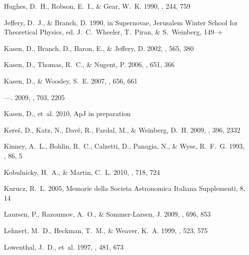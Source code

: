 \documentclass[]{emulateapj}
\begin{document}
\begin{thebibliography}{74}
{Hughes}, D.~H., {Robson}, E.~I., \& {Gear}, W.~K. 1990, \mnras, 244, 759

{Jeffery}, D.~J., \& {Branch}, D. 1990, in Supernovae, Jerusalem Winter School
  for Theoretical Physics, ed. {J.~C.~Wheeler, T.~Piran, \& S.~Weinberg},
  149--+

{Kasen}, D., {Branch}, D., {Baron}, E., \& {Jeffery}, D. 2002, \apj, 565, 380

{Kasen}, D., {Thomas}, R.~C., \& {Nugent}, P. 2006, \apj, 651, 366

{Kasen}, D., \& {Woosley}, S.~E. 2007, \apj, 656, 661

---. 2009, \apj, 703, 2205

{Kasen}, D., {et~al.} 2010, ApJ in preparation

{Kere{\v s}}, D., {Katz}, N., {Dav{\'e}}, R., {Fardal}, M., \& {Weinberg},
  D.~H. 2009, \mnras, 396, 2332

{Kinney}, A.~L., {Bohlin}, R.~C., {Calzetti}, D., {Panagia}, N., \& {Wyse},
  R.~F.~G. 1993, \apjs, 86, 5

{Kobulnicky}, H.~A., \& {Martin}, C.~L. 2010, \apj, 718, 724

{Kurucz}, R.~L. 2005, Memorie della Societa Astronomica Italiana Supplementi,
  8, 14

{Laursen}, P., {Razoumov}, A.~O., \& {Sommer-Larsen}, J. 2009, \apj, 696, 853

{Lehnert}, M.~D., {Heckman}, T.~M., \& {Weaver}, K.~A. 1999, \apj, 523, 575

{Lowenthal}, J.~D., {et~al.} 1997, \apj, 481, 673


\end{thebibliography}
\end{document}
